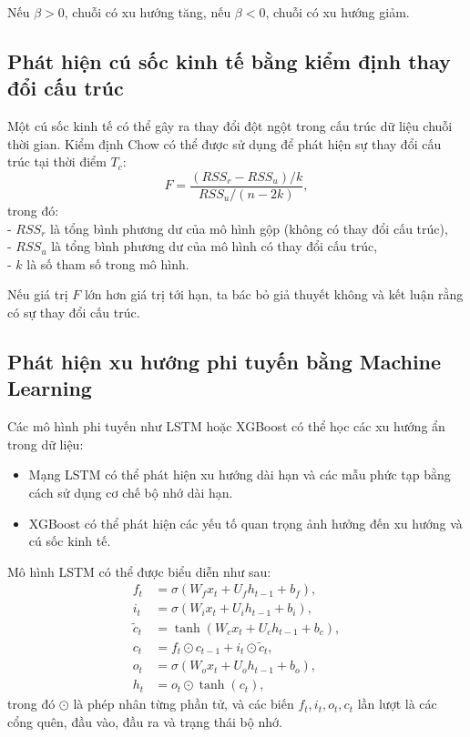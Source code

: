Nếu $\beta > 0$, chuỗi có xu hướng tăng, nếu $\beta < 0$, chuỗi có xu hướng giảm.

\subsection{Phát hiện cú sốc kinh tế bằng kiểm định thay đổi cấu trúc}
Một cú sốc kinh tế có thể gây ra thay đổi đột ngột trong cấu trúc dữ liệu chuỗi thời gian. Kiểm định Chow có thể được sử dụng để phát hiện sự thay đổi cấu trúc tại thời điểm $T_c$:
\begin{equation}
    F = \frac{(RSS_r - RSS_u) / k}{RSS_u / (n - 2k)},
\end{equation}
trong đó: \\
- $RSS_r$ là tổng bình phương dư của mô hình gộp (không có thay đổi cấu trúc), \\
- $RSS_u$ là tổng bình phương dư của mô hình có thay đổi cấu trúc, \\
- $k$ là số tham số trong mô hình.

Nếu giá trị $F$ lớn hơn giá trị tới hạn, ta bác bỏ giả thuyết không và kết luận rằng có sự thay đổi cấu trúc.

\subsection{Phát hiện xu hướng phi tuyến bằng Machine Learning}
Các mô hình phi tuyến như LSTM hoặc XGBoost có thể học các xu hướng ẩn trong dữ liệu:
\begin{itemize}
    \item Mạng LSTM có thể phát hiện xu hướng dài hạn và các mẫu phức tạp bằng cách sử dụng cơ chế bộ nhớ dài hạn.
    \item XGBoost có thể phát hiện các yếu tố quan trọng ảnh hưởng đến xu hướng và cú sốc kinh tế.
\end{itemize}
Mô hình LSTM có thể được biểu diễn như sau:
\begin{align}
    f_t &= \sigma(W_f x_t + U_f h_{t-1} + b_f), \\
    i_t &= \sigma(W_i x_t + U_i h_{t-1} + b_i), \\
    \tilde{c}_t &= \tanh(W_c x_t + U_c h_{t-1} + b_c), \\
    c_t &= f_t \odot c_{t-1} + i_t \odot \tilde{c}_t, \\
    o_t &= \sigma(W_o x_t + U_o h_{t-1} + b_o), \\
    h_t &= o_t \odot \tanh(c_t),
\end{align}
trong đó $\odot$ là phép nhân từng phần tử, và các biến $f_t, i_t, o_t, c_t$ lần lượt là các cổng quên, đầu vào, đầu ra và trạng thái bộ nhớ.
